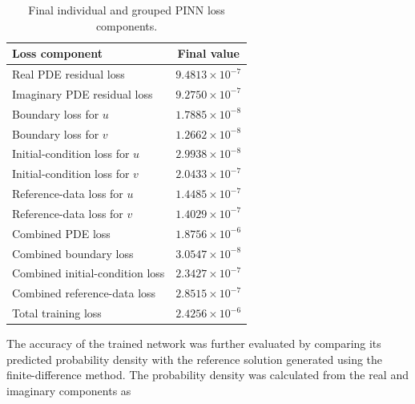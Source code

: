 \documentclass[11pt]{article}
\begin{document}
\begin{table}[htbp]
	\centering
	\caption{Final individual and grouped PINN loss components.}
	\label{tab:loss_components}
	\begin{tabular}{lc}
		\hline
		\textbf{Loss component} & \textbf{Final value} \\
		\hline
		Real PDE residual loss
		& \(9.4813\times10^{-7}\) \\
		
		Imaginary PDE residual loss
		& \(9.2750\times10^{-7}\) \\
		
		Boundary loss for \(u\)
		& \(1.7885\times10^{-8}\) \\
		
		Boundary loss for \(v\)
		& \(1.2662\times10^{-8}\) \\
		
		Initial-condition loss for \(u\)
		& \(2.9938\times10^{-8}\) \\
		
		Initial-condition loss for \(v\)
		& \(2.0433\times10^{-7}\) \\
		
		Reference-data loss for \(u\)
		& \(1.4485\times10^{-7}\) \\
		
		Reference-data loss for \(v\)
		& \(1.4029\times10^{-7}\) \\
		\hline
		Combined PDE loss
		& \(1.8756\times10^{-6}\) \\
		
		Combined boundary loss
		& \(3.0547\times10^{-8}\) \\
		
		Combined initial-condition loss
		& \(2.3427\times10^{-7}\) \\
		
		Combined reference-data loss
		& \(2.8515\times10^{-7}\) \\
		
		Total training loss
		& \(2.4256\times10^{-6}\) \\
		\hline
	\end{tabular}
	
\end{table}

The accuracy of the trained network was further evaluated by comparing its predicted probability density with the reference solution generated using the finite-difference method. The probability density was calculated from the real and imaginary components as
\end{document}
